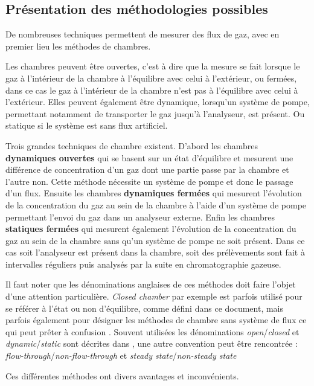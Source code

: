 \subsection{Présentation des méthodologies possibles}
De nombreuses techniques permettent de mesurer des flux de gaz, avec en premier lieu les méthodes de chambres.


Les chambres peuvent être ouvertes, c'est à dire que la mesure se fait lorsque le gaz à l'intérieur de la chambre à l'équilibre avec celui à l'extérieur, ou fermées, dans ce cas le gaz à l'intérieur de la chambre n'est pas à l'équilibre avec celui à l'extérieur.
Elles peuvent également être dynamique, lorsqu'un système de pompe, permettant notamment de transporter le gaz jusqu'à l'analyseur, est présent.
Ou statique si le système est sans flux artificiel.

Trois grandes techniques de chambre existent.
D'abord les chambres \textbf{dynamiques ouvertes} qui se basent sur un état d'équilibre et mesurent une différence de concentration d'un gaz dont une partie passe par la chambre et l'autre non. 
Cette méthode nécessite un système de pompe et donc le passage d'un flux.
Ensuite les chambres \textbf{dynamiques fermées} qui mesurent l'évolution de la concentration du gaz au sein de la chambre à l'aide d'un système de pompe permettant l'envoi du gaz dans un analyseur externe.
Enfin les chambres \textbf{statiques fermées} qui mesurent également l'évolution de la concentration du gaz au sein de la chambre sans qu'un système de pompe ne soit présent.
Dans ce cas soit l'analyseur est présent dans la chambre, soit des prélèvements sont fait à intervalles réguliers puis analysés par la suite en chromatographie gazeuse.

Il faut noter que les dénominations anglaises de ces méthodes doit faire l'objet d'une attention particulière.
\textit{Closed chamber} par exemple est parfois utilisé pour se référer à l'état ou non d'équilibre, comme défini dans ce document, mais parfois également pour désigner les méthodes de chambre sans système de flux ce qui peut prêter à confusion \cite{pumpanen2004}.
Souvent utilisées les dénominations \textit{open}/\textit{closed} et \textit{dynamic}/\textit{static} sont décrites dans \cite{luo2006161}, une autre convention peut être rencontrée : \textit{flow-through}/\textit{non-flow-through} et \textit{steady state}/\textit{non-steady state} \cite{livingston1995}

Ces différentes méthodes ont divers avantages et inconvénients.

